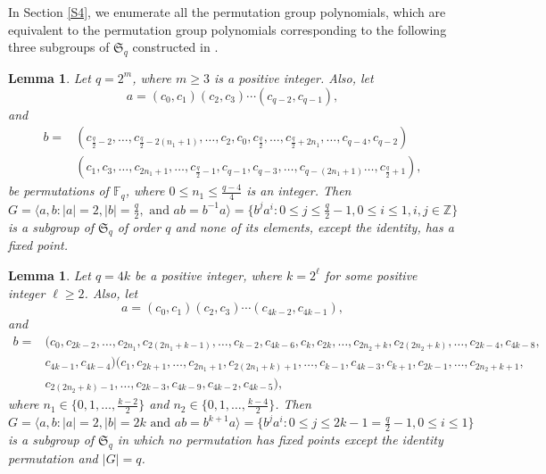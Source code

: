 \documentclass[11pt]{amsart}
\theoremstyle{plain}
\newtheorem{lem}[thm]{Lemma}
\numberwithin{equation}{section}
\def\F{{\mathbb F}}
\begin{document}
In Section \ref{S4}, we enumerate all the permutation group polynomials, which are equivalent to the permutation group polynomials corresponding to the following three subgroups of $\mathfrak{S}_q$ constructed in \cite{HK}.

  \begin{lem}\label{HK1}{\upshape \cite[Theorem 3.1]{HK}}
  Let $q=2^m$, where $m\geq 3$ is a positive integer. Also, let
\[
a=(c_0,c_1)(c_2,c_3)\cdots(c_{q-2},c_{q-1}),
\]
and
\begin{equation*}
    \begin{split}
        b= &(c_{\frac{q}{2}-2},\ldots,c_{\frac{q}{2}-2(n_1+1)}, \ldots,c_{2},c_{0},  c_{\frac{q}{2}},\ldots, c_{\frac{q}{2}+2n_1},\ldots,c_{q-4},c_{q-2})\\
        &(c_{1},c_{3},\ldots, c_{2n_1+1}, \ldots,c_{\frac{q}{2}-1},c_{q-1},c_{q-3},\ldots, c_{q-(2n_1+1)} \ldots,c_{\frac{q}{2}+1}),
    \end{split}
\end{equation*}
 be permutations of $\F_q$, where $0 \leq n_1 \leq \frac{q-4}{4}$ is an integer. Then $G=\langle a,b: |a|=2, |b|=\frac{q}{2}, \text { and } ab=b^{-1}a \rangle=\{b^{j}a^{i}: 0 \leq j \leq \frac{q}{2}-1,0\leq i \leq 1, i,j \in \mathbb{Z} \}$ is a subgroup of ${\mathfrak S}_q$ of order $q$ and none of its elements, except the identity, has a fixed point. 
  \end{lem}
 \begin{lem}\label{HK2}{\upshape \cite[Theorem 3.9]{HK}}
Let $q=4k$ be a positive integer, where $k=2^{\ell}$ for some positive integer $\ell \geq 2$. Also, let
\[
a=(c_0,c_1)(c_2,c_3)\cdots(c_{4k-2},c_{4k-1}),
\]
and
\begin{equation*}
    \begin{split}
        b=& (c_0, c_{2k-2}, \ldots, c_{2n_1}, c_{2(2n_1+k-1)}, \ldots , c_{k-2}, c_{4k-6},c_k,c_{2k}, \ldots, c_{2n_2+k},c_{2(2n_2+k)}, \ldots, c_{2k-4}, c_{4k-8}, \\
        &  c_{4k-1}, c_{4k-4}) (c_1, c_{2k+1}, \ldots, c_{2n_1+1}, c_{2(2n_1+k)+1}, \ldots , c_{k-1}, c_{4k-3},c_{k+1},c_{2k-1}, \ldots, c_{2n_2+k+1},\\
        & c_{2(2n_2+k)-1}, \ldots, c_{2k-3}, c_{4k-9},  c_{4k-2}, c_{4k-5}),
    \end{split}
\end{equation*}
where $n_1 \in \{0,1,\ldots, \frac{k-2}{2}\}$ and $n_2 \in \{0,1,\ldots, \frac{k-4}{2}\}$.
Then $G=\langle a,b: |a|=2, |b|=2k \text{ and } ab=b^{k+1}a\rangle=\{b^{j}a^{i}: 0 \leq j \leq 2k-1=\frac{q}{2}-1, 0\leq i \leq 1\}$ is a subgroup of $\mathfrak {S}_q$ in which  no permutation has fixed points except the identity permutation and $|G|=q$.
\end{lem}
\end{document}

